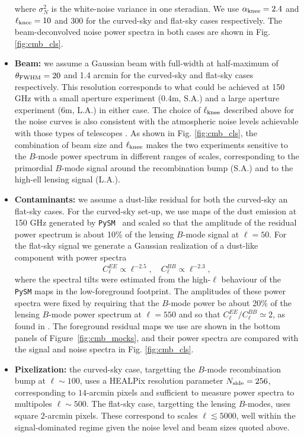 \documentclass[usenatbib]{mnrasb}
\begin{document}
\begin{itemize}
          where $\sigma_N^2$ is the white-noise variance in one steradian. We use $\alpha_{\rm knee}=2.4$ and $\ell_{\rm knee}=10$ and 300 for the curved-sky and flat-sky cases respectively. The beam-deconvolved noise power spectra in both cases are shown in Fig. \ref{fig:cmb_cls}.
          \item {\bf Beam:} we assume a Gaussian beam with full-width at half-maximum of $\theta_{\rm FWHM}=20$ and 1.4 arcmin for the curved-sky and flat-sky cases respectively. This resolution corresponds to what could be achieved at 150 GHz with a small aperture experiment (0.4m, S.A.) and a large aperture experiment (6m, L.A.) in either case. The choice of $\ell_{\rm knee}$ described above for the noise curves is also consistent with the atmospheric noise levels achievable with those types of telescopes \citep{2018arXiv180807445T}. As shown in Fig. \ref{fig:cmb_cls}, the combination of beam size and $\ell_{\rm knee}$ makes the two experiments sensitive to the $B$-mode power spectrum in different ranges of scales, corresponding to the primordial $B$-mode signal around the recombination bump (S.A.) and to the high-ell lensing signal (L.A.).
          \item {\bf Contaminants:} we assume a dust-like residual for both the curved-sky an flat-sky cases. For the curved-sky set-up, we use maps of the dust emission at 150 GHz generated by {\tt PySM}~\citep{2017MNRAS.469.2821T} and scaled so that the amplitude of the residual power spectrum is about 10\% of the lensing $B$-mode signal at $\ell=50$. For the flat-sky signal we generate a Gaussian realization of a dust-like component with power spectra
          \begin{equation}
            C_\ell^{EE}\propto\ell^{-2.5},\hspace{12pt}
            C_\ell^{BB}\propto\ell^{-2.3},
          \end{equation}
          where the spectral tilts were estimated from the high-$\ell$ behaviour of the {\tt PySM} maps in the low-foreground footprint. The amplitudes of these power spectra were fixed by requiring that the $B$-mode power be about 20\% of the lensing $B$-mode power spectrum at $\ell=550$ and so that $C_\ell^{EE}/C_\ell^{BB}\simeq2$, as found in \citet{2016A&A...594A..13P}. The foreground residual maps we use are shown in the bottom panels of Figure~\ref{fig:cmb_mocks}, and their power spectra are compared with the signal and noise spectra in Fig. \ref{fig:cmb_cls}.
          \item {\bf Pixelization:} the curved-sky case, targetting the $B$-mode recombination bump at $\ell\sim100$, uses a HEALPix resolution parameter $N_{\rm side}=256$, corresponding to $14$-arcmin pixels and sufficient to measure power spectra to multipoles $\ell\sim500$. The flat-sky case, targetting the lensing $B$-modes, uses square 2-arcmin pixels. These correspond to scales $\ell\lesssim5000$, well within the signal-dominated regime given the noise level and beam sizes quoted above.
        \end{itemize}
\end{document}

